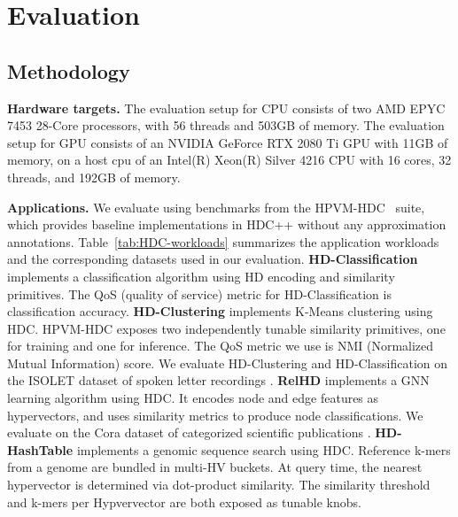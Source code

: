 \section{Evaluation}
\label{sec:eval}

\subsection{Methodology}
\label{sec:eval-methodology}



\textbf{Hardware targets.}
The evaluation setup for CPU consists of two AMD EPYC 7453 28-Core processors, with 56 threads and 503GB of memory. 
The evaluation setup for GPU consists of an NVIDIA GeForce RTX 2080 Ti GPU with 11GB of memory, on a host cpu of an Intel(R) Xeon(R) Silver 4216 CPU with 16 cores, 32 threads, and 192GB of memory.

\textbf{Applications.}
We evaluate \pname{} using benchmarks from the HPVM-HDC~\cite{hpvm-hdc} suite, which provides baseline implementations in HDC++ without any approximation annotations. Table~\ref{tab:HDC-workloads} summarizes the application workloads and the corresponding datasets used in our evaluation.
\textbf{HD-Classification} implements a classification algorithm using HD encoding and similarity primitives. The QoS (quality of service) metric for HD-Classification is classification accuracy. \textbf{HD-Clustering} implements K-Means clustering using HDC. HPVM-HDC exposes two independently tunable similarity primitives, one for training and one for inference. The QoS metric we use is NMI (Normalized Mutual Information) score. We evaluate HD-Clustering and HD-Classification on the ISOLET dataset of spoken letter recordings \cite{isolet}.  \textbf{RelHD} \cite{relhd} implements a GNN learning algorithm using HDC. It encodes node and edge features as hypervectors, and uses similarity metrics to produce node classifications. We evaluate on the Cora dataset of categorized scientific publications \cite{cora}. \textbf{HD-HashTable} \cite{biohd} implements a genomic sequence search using HDC. Reference k-mers from a genome are bundled in multi-HV buckets. At query time, the nearest hypervector is determined via dot-product similarity. The similarity threshold and k-mers per Hypvervector are both exposed as tunable knobs.


